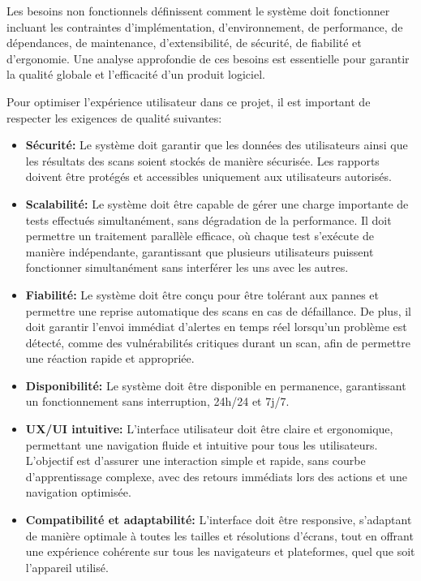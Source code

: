 \begin{justify}
    Les besoins non fonctionnels définissent comment le système doit fonctionner incluant les contraintes d’implémentation, d’environnement, de performance, de dépendances, de maintenance, d’extensibilité, de sécurité, de fiabilité et d’ergonomie. Une analyse approfondie de ces besoins est essentielle pour garantir la qualité globale et l’efficacité d’un produit logiciel\cite{bnf}.

    Pour optimiser l’expérience utilisateur dans ce projet, il est important de respecter les exigences de qualité suivantes:
     \begin{itemize}[label=$\bullet$, left=0.15cm]
        \item \textbf{Sécurité:} Le système doit garantir que les données des utilisateurs ainsi que les résultats des scans soient stockés de manière sécurisée. Les rapports doivent être protégés et accessibles uniquement aux utilisateurs autorisés.
        \item \textbf{Scalabilité:} Le système doit être capable de gérer une charge importante de tests effectués simultanément, sans dégradation de la performance. Il doit permettre un traitement parallèle efficace, où chaque test s'exécute de manière indépendante, garantissant que plusieurs utilisateurs puissent fonctionner simultanément sans interférer les uns avec les autres.
        \item \textbf{Fiabilité:} Le système doit être conçu pour être tolérant aux pannes et permettre une reprise automatique des scans en cas de défaillance. De plus, il doit garantir l'envoi immédiat d'alertes en temps réel lorsqu'un problème est détecté, comme des vulnérabilités critiques durant un scan, afin de permettre une réaction rapide et appropriée.
        \item \textbf{Disponibilité:} Le système doit être disponible en permanence, garantissant un fonctionnement sans interruption, 24h/24 et 7j/7.
        \item \textbf{UX/UI intuitive:} L'interface utilisateur doit être claire et ergonomique, permettant une navigation fluide et intuitive pour tous les utilisateurs. L'objectif est d'assurer une interaction simple et rapide, sans courbe d'apprentissage complexe, avec des retours immédiats lors des actions et une navigation optimisée.
        \item \textbf{Compatibilité et adaptabilité:} L'interface doit être responsive, s’adaptant de manière optimale à toutes les tailles et résolutions d’écrans, tout en offrant une expérience cohérente sur tous les navigateurs et plateformes, quel que soit l'appareil utilisé.
    \end{itemize}
\end{justify}   